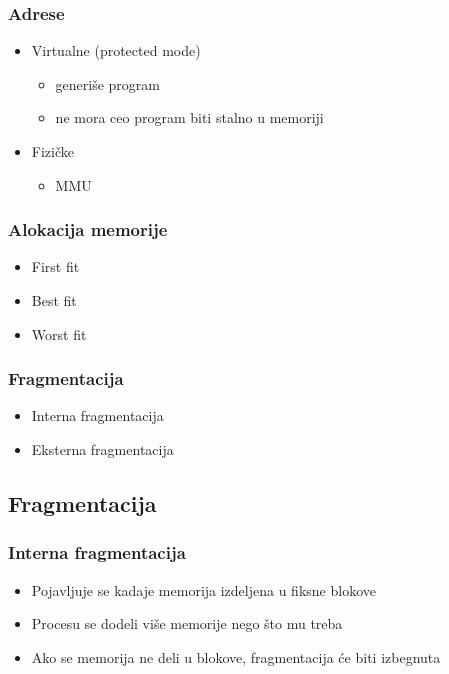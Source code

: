\documentclass{beamer}
\begin{document}
\begin{frame}
    \frametitle{Adrese}
    \begin{itemize}
        \item Virtualne (protected mode) \begin{itemize}
            \item generiše program \newline
            \item ne mora ceo program biti stalno u memoriji \newline
        \end{itemize}
        \item Fizičke \begin{itemize}
            \item MMU
        \end{itemize}
    \end{itemize}
\end{frame}

\begin{frame}
    \frametitle{Alokacija memorije}
    \begin{itemize}
        \item First fit \newline
        \item Best fit \newline
        \item Worst fit
    \end{itemize}
\end{frame}

\begin{frame}
    \frametitle{Fragmentacija}
    \begin{itemize}
        \item Interna fragmentacija \newline
        \item Eksterna fragmentacija
    \end{itemize}
\end{frame}

\subsection*{Fragmentacija}
\begin{frame}
    \frametitle{Interna fragmentacija}
    \begin{itemize}
        \item Pojavljuje se kadaje memorija izdeljena u fiksne blokove \newline
        \item Procesu se dodeli više memorije nego što mu treba \newline
        \item Ako se memorija ne deli u blokove, fragmentacija će biti izbegnuta
    \end{itemize}
\end{frame}
\end{document}
